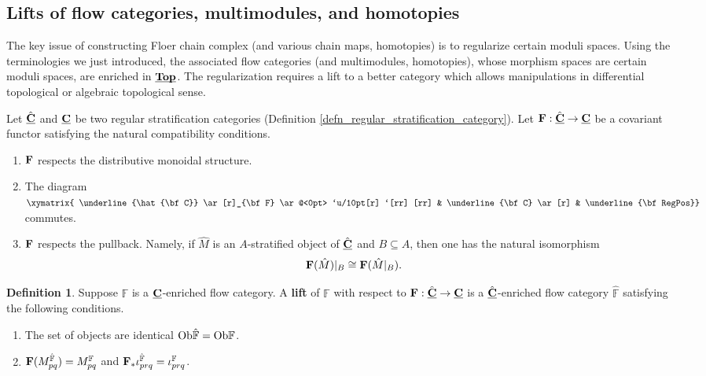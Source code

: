 \documentclass[reqno, 10pt]{amsart}
\numberwithin{equation}{section}
\numberwithin{equation}{section}
\renewcommand{\subset}{\subseteq}
\theoremstyle{definition}
\newtheorem{defn}[thm]{Definition}
\theoremstyle{remark}
\newcommand{\beqn}{\begin{equation*}}
\newcommand{\eeqn}{\end{equation*}}
\newcommand{\mb}{\mathbb}
\newcommand{\uds}[1]{\underline{\smash{#1}}}
\begin{document}
\subsection{Lifts of flow categories, multimodules, and homotopies}

The key issue of constructing Floer chain complex (and various chain maps, homotopies) is to regularize certain moduli spaces. Using the terminologies we just introduced, the associated flow categories (and multimodules, homotopies), whose morphism spaces are certain moduli spaces, are enriched in $\uds{\bf Top}$. The regularization requires a lift to a better category which allows manipulations in differential topological or algebraic topological sense. 

Let $\uds{\hat{\bf C}}$ and $\uds{\bf C}$ be two regular stratification categories (Definition \ref{defn_regular_stratification_category}). Let ${\bf F}: \uds{\hat{\bf C}} \to \uds{\bf C}$ be a covariant functor satisfying the natural compatibility conditions.
\begin{enumerate}
    \item ${\bf F}$ respects the distributive monoidal structure. \vspace{0.2cm}

    \item The diagram $    \xymatrix{ \underline{\hat{\bf C}} \ar[r]_{\bf F} \ar@<0pt> `u/10pt[r] `[rr] [rr] & \underline{\bf C} \ar[r]               & \underline{\bf RegPos}}$    commutes.

    \item ${\bf F}$ respects the pullback. Namely, if $\hat M$ is an $A$-stratified object of $\uds{\hat{\bf C}}$ and $B \subset A$, then one has the natural isomorphism
    \beqn
    {\bf F}(\hat M)|_B \cong {\bf F}(\hat M|_B).
    \eeqn
\end{enumerate}

\begin{defn}\label{defn:lifting}
Suppose ${\mb F}$ is a $\uds{\bf C}$-enriched flow category. A {\bf lift} of ${\mb F}$ with respect to ${\bf F}: \uds{\hat{\bf C}} \to \uds{\bf C}$ is a $\uds{\hat{\bf C}}$-enriched flow category $\hat{\mb F}$ satisfying the following conditions.
\begin{enumerate}
\item The set of objects are identical ${\rm Ob}\hat{\mb F} = {\rm Ob} {\mb F}$.

\item ${\bf F}(M_{pq}^{\hat {\mb F}}) = M_{pq}^{\mb F}$ and ${\bf F}_* \iota_{prq}^{\hat{\mb F}} = \iota_{prq}^{\mb F}$.
\end{enumerate}
\end{defn}
\end{document}
